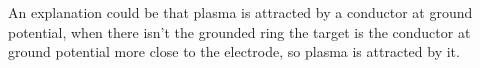 An explanation could be that plasma is attracted by a conductor at ground potential, when there isn't the grounded ring the target is the conductor at ground potential more close to the electrode, so plasma is attracted by it.
\begin{figure}
 \centering
 \hfill
 
 

\end{figure}
